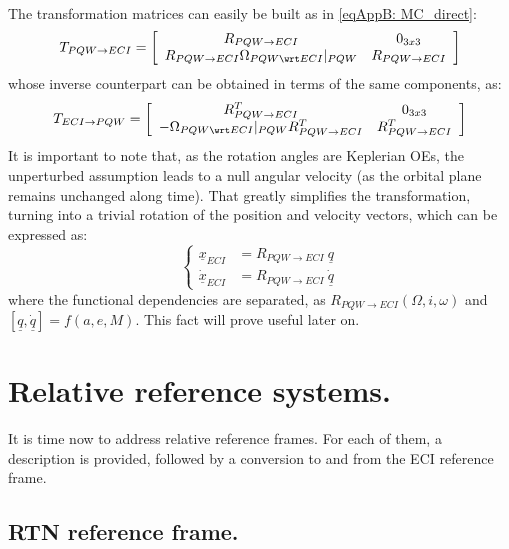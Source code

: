 			\paragraph{\\}
			\indent The transformation matrices can easily be built as in \eqref{eqAppB: 	MC_direct}:
			\[
			 T_{PQW\to ECI} = \left[\begin{array}{cc}
	R_{PQW\to ECI} & 0_{3x3} \\
	R_{PQW\to ECI} \Omega_{PQW \wrt ECI}\rvert_{PQW} & R_{PQW\to ECI}
	\end{array}\right]
			\]
			\noindent whose inverse counterpart can be obtained in terms of the same components, as:
			\[
			 T_{ECI\to PQW} = \left[\begin{array}{cc}
	R_{PQW\to ECI}^T & 0_{3x3} \\
	-\Omega_{PQW \wrt ECI}\rvert_{PQW} R_{PQW\to ECI}^T & R_{PQW\to ECI}^T
	\end{array}\right]
			\]
			\indent It is important to note that, as the rotation angles are Keplerian OEs, the unperturbed assumption leads to a null angular velocity (as the orbital plane remains unchanged along time). That greatly simplifies the transformation, turning into a trivial rotation of the position and velocity vectors, which can be expressed as:
			\begin{equation}
			\left\{\begin{array}{lll}
			\underline{x}_{ECI} & = R_{PQW\to ECI} \ \underline{q} \\
			\underline{\dot{x}}_{ECI} & = R_{PQW\to ECI} \ \underline{\dot{q}} 
			\end{array}\right.
			\label{eqAppB:PQW2ECI}
			\end{equation}
			\noindent where the functional dependencies are separated, as $R_{PQW\to ECI}(\Omega, i, \omega)$ and $[\underline{q}, \underline{\dot{q}}] = f(a, e, M)$. This fact will prove useful later on.
\section{Relative reference systems.}
%
\indent It is time now to address relative reference frames. For each of them, a description is provided, followed by a conversion to and from the ECI reference frame. 
%
	\subsection{RTN reference frame.} \label{secAppB:RTN}

